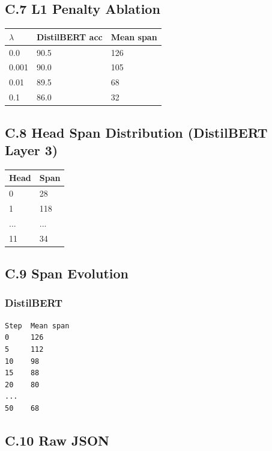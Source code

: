 \subsection{C.7 L1 Penalty Ablation}

\begin{table}[H]
\centering
\small
\begin{tabular}{lll}
\toprule
\textbf{$\lambda$} & \textbf{DistilBERT acc} & \textbf{Mean span} \\
\midrule
0.0 & 90.5 & 126 \\
0.001 & 90.0 & 105 \\
0.01 & 89.5 & 68 \\
0.1 & 86.0 & 32 \\
\bottomrule
\end{tabular}
\end{table}

\subsection{C.8 Head Span Distribution (DistilBERT Layer 3)}

\begin{table}[H]
\centering
\small
\begin{tabular}{ll}
\toprule
\textbf{Head} & \textbf{Span} \\
\midrule
0 & 28 \\
1 & 118 \\
... & ... \\
11 & 34 \\
\bottomrule
\end{tabular}
\end{table}

\subsection{C.9 Span Evolution}

\subsubsection{DistilBERT}
\begin{lstlisting}
Step  Mean span
0     126
5     112
10    98
15    88
20    80
...
50    68
\end{lstlisting}

\subsection{C.10 Raw JSON}

